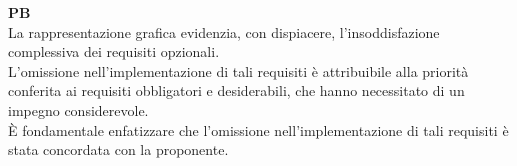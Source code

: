 \vspace{0.2cm}

\textbf{PB} \\
La rappresentazione grafica evidenzia, con dispiacere, l’insoddisfazione complessiva dei requisiti opzionali. \\
L’omissione nell’implementazione di tali requisiti è attribuibile alla priorità conferita ai requisiti obbligatori e desiderabili, che hanno necessitato di un impegno considerevole. \\
È fondamentale enfatizzare che l’omissione nell’implementazione di tali requisiti è stata concordata con la proponente.